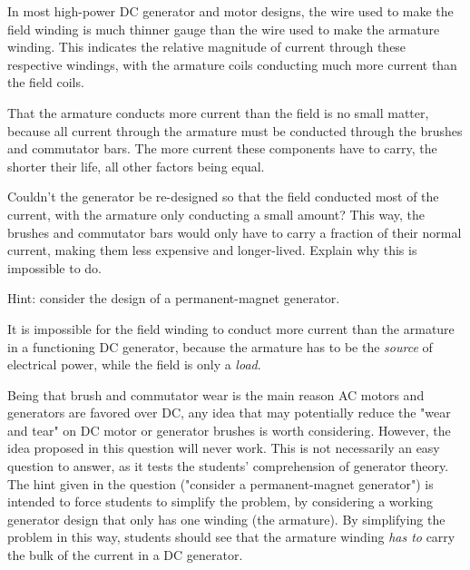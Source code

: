 

In most high-power DC generator and motor designs, the wire used to make the field winding is much thinner gauge than the wire used to make the armature winding.  This indicates the relative magnitude of current through these respective windings, with the armature coils conducting much more current than the field coils.

That the armature conducts more current than the field is no small matter, because all current through the armature must be conducted through the brushes and commutator bars.  The more current these components have to carry, the shorter their life, all other factors being equal.

Couldn't the generator be re-designed so that the field conducted most of the current, with the armature only conducting a small amount?  This way, the brushes and commutator bars would only have to carry a fraction of their normal current, making them less expensive and longer-lived.  Explain why this is impossible to do.

\vskip 10pt

Hint: consider the design of a permanent-magnet generator.







It is impossible for the field winding to conduct more current than the armature in a functioning DC generator, because the armature has to be the {\it source} of electrical power, while the field is only a {\it load}.







Being that brush and commutator wear is the main reason AC motors and generators are favored over DC, any idea that may potentially reduce the "wear and tear" on DC motor or generator brushes is worth considering.  However, the idea proposed in this question will never work.  This is not necessarily an easy question to answer, as it tests the students' comprehension of generator theory.  The hint given in the question ("consider a permanent-magnet generator") is intended to force students to simplify the problem, by considering a working generator design that only has one winding (the armature).  By simplifying the problem in this way, students should see that the armature winding {\it has to} carry the bulk of the current in a DC generator.




